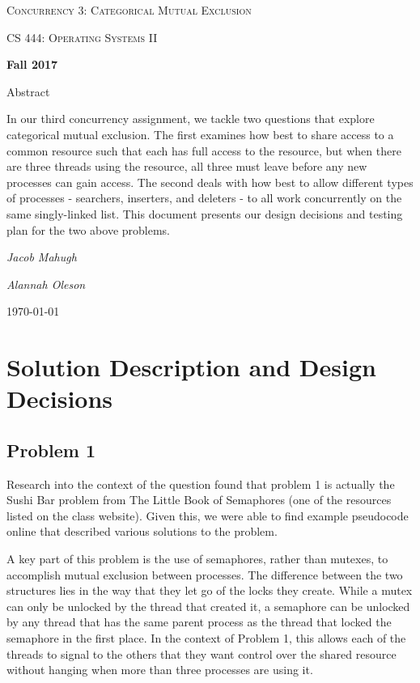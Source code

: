 \documentclass[letterpaper,10pt,titlepage]{article}
\begin{document}
\begin{titlepage}
	\centering
	\vspace*{4cm}
	{\scshape\huge Concurrency 3: Categorical Mutual Exclusion\par}
	\vspace{1cm}
	{\scshape\LARGE CS 444: Operating Systems II\par}
	\vspace{0.5cm}
	{\large\bfseries Fall 2017\par}
    \vspace{1cm}
	{\large Abstract\par}
	In our third concurrency assignment, we tackle two questions
    that explore categorical mutual exclusion.
    The first examines how best to share access to a
    common resource such that each has full access to the
    resource, but when there are three threads using the resource,
    all three must leave before any new processes can gain access.
    The second deals with how best to allow different types
    of processes - searchers, inserters, and deleters - to all
    work concurrently on the same singly-linked list.
    This document presents our design decisions and testing plan
    for the two above problems.
	\par
	\vspace{1cm}
	{\Large\itshape Jacob Mahugh\par}
    \vspace {0.5cm}
    {\Large\itshape Alannah Oleson\par}
	\vfill
	{\large \today\par}
\end{titlepage}



\section{Solution Description and Design Decisions}

\subsection{Problem 1}
Research into the context of the question found that problem 1 is
actually the Sushi Bar problem from The Little Book of Semaphores (one
of the resources listed on the class website).
Given this, we were able to find example pseudocode online that described
various solutions to the problem.

A key part of this problem is the use of semaphores, rather than mutexes,
to accomplish mutual exclusion between processes. The difference between
the two structures lies in the way that they let go of the locks they create.
While a mutex can only be unlocked by the thread that created it, a
semaphore can be unlocked by any thread that has the same parent process
as the thread that locked the semaphore in the first place.
In the context of Problem 1, this allows each of the threads to signal to the
others that they want control over the shared resource without hanging
when more than three processes are using it.
\end{document}
